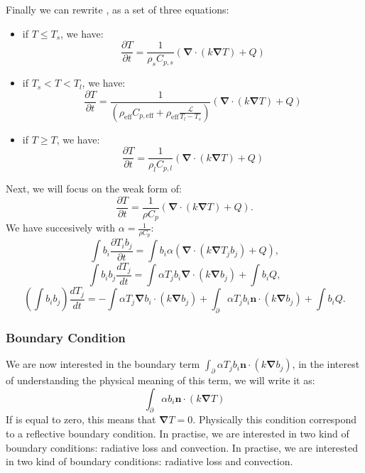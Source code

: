 \documentclass[letterpaper]{article}
\newcommand\bn{\boldsymbol{\nabla}}
\renewcommand{\(}{\left(}
\renewcommand{\)}{\right)}
\renewcommand{\[}{\left[}
\renewcommand{\]}{\right]}
\begin{document}
Finally we can rewrite , as a set of three equations:
\begin{itemize}
  \item if $T \leq T_s$, we have:
    \begin{equation}
      \frac{\partial T}{\partial t} = \frac{1}{\rho_s C_{p,s}} \(\bn \cdot \(k
      \bn T\) + Q\)
    \end{equation}
  \item if $T_s < T < T_l$, we have:
    \begin{equation}
      \frac{\partial T}{\partial t} = \frac{1}{\(\rho_{\text{eff}}
      C_{p,\text{eff}} + \rho_{\text{eff}} \frac{\mathcal{L}}{T_l-T_s}\)} \(
      \bn \cdot \(k \bn T\) + Q \)
    \end{equation}
  \item if $T \geq T$, we have:
    \begin{equation}
      \frac{\partial T}{\partial t} = \frac{1}{\rho_l C_{p,l}} \(\bn \cdot \(k
      \bn T\) + Q\)
    \end{equation}
\end{itemize}

Next, we will focus on the weak form of:
\begin{equation}
  \frac{\partial T}{\partial t} = \frac{1}{\rho C_{p}} \(\bn \cdot \(k
  \bn T\) + Q\).
\end{equation}
We have succesively with $\alpha = \frac{1}{\rho C_{p}}$:
\begin{equation}
 \int b_i \frac{\partial T_i b_j}{\partial t} = \int b_i \alpha \(\bn \cdot \(k
  \bn T_j b_j\) + Q\),
\end{equation}
\begin{equation}
  \int b_i b_j \frac{d T_j}{dt} = \int \alpha T_j b_i \bn \cdot \(k \bn b_j\) +
  \int b_i Q,
\end{equation}
\begin{equation}
  \(\int b_i b_j\) \frac{d T_j}{dt} = - \int \alpha T_j \bn b_i \cdot \(k \bn b_j\) +
  \int_{\partial} \alpha T_j b_i \boldsymbol{n}\cdot \(k \bn b_j\) + \int b_i Q.
\end{equation}

\subsubsection{Boundary Condition}
We are now interested in the boundary term  $\int_{\partial} \alpha T_j b_i
\boldsymbol{n}\cdot \(k \bn b_j\)$, in the interest of understanding the
physical meaning of this term, we will write it as:
\begin{equation}
 \int_{\partial} \alpha b_i \boldsymbol{n}\cdot \(k \bn T\)
  \label{boundary}
\end{equation}
If  is equal to zero, this means that $\bn T=0$. Physically this
condition correspond to a reflective boundary condition. In practise, we are
interested in two kind of boundary conditions: radiative loss and convection. In
practise, we are interested in two kind of boundary conditions: radiative loss
and convection.
\end{document}
